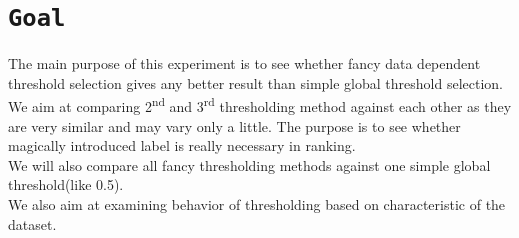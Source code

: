 \documentclass[12pt,a4paper,twocolumn]{article}
\newcommand{\ts}{\textsuperscript}
\begin{document}
\section*{\texttt{Goal}}
The main purpose of this experiment is to see whether fancy data dependent threshold selection gives any better result than simple global threshold selection.\\
We aim at comparing 2\ts{nd} and 3\ts{rd} thresholding method against each other as they are very similar and may vary only a little. The purpose is to see whether magically introduced label is really necessary in ranking.\\
We will also compare all fancy thresholding methods against one simple global threshold(like 0.5).\\
We also aim at examining behavior of thresholding based on characteristic of the dataset.\\


\end{document}
